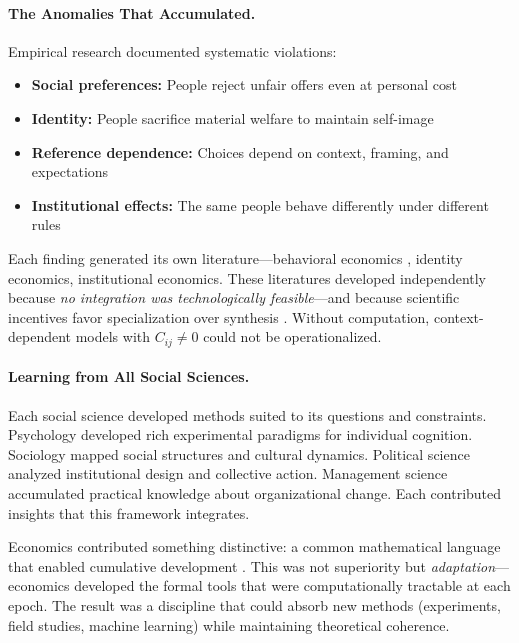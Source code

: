 \paragraph{The Anomalies That Accumulated.}
Empirical research documented systematic violations:
\begin{itemize}
  \item \textbf{Social preferences:} People reject unfair offers even at personal cost \citep{guth1982,fehrschmidt}
  \item \textbf{Identity:} People sacrifice material welfare to maintain self-image \citep{akerlofkranton,benaboutirole}
  \item \textbf{Reference dependence:} Choices depend on context, framing, and expectations \citep{kahnemantversky1979}
  \item \textbf{Institutional effects:} The same people behave differently under different rules \citep{north1990,acemoglu}
\end{itemize}

Each finding generated its own literature---behavioral economics \citep{camloewrabin}, identity economics, institutional economics. These literatures developed independently because \emph{no integration was technologically feasible}---and because scientific incentives favor specialization over synthesis \citep{smaldino2016,kuhn1962}. Without computation, context-dependent models with $C_{ij} \neq 0$ could not be operationalized.

\paragraph{Learning from All Social Sciences.}
Each social science developed methods suited to its questions and constraints. Psychology developed rich experimental paradigms for individual cognition. Sociology mapped social structures and cultural dynamics. Political science analyzed institutional design and collective action. Management science accumulated practical knowledge about organizational change. Each contributed insights that this framework integrates.

Economics contributed something distinctive: a common mathematical language that enabled cumulative development \citep{fourcade2009,fourcade2015}. This was not superiority but \emph{adaptation}---economics developed the formal tools that were computationally tractable at each epoch. The result was a discipline that could absorb new methods (experiments, field studies, machine learning) while maintaining theoretical coherence.

